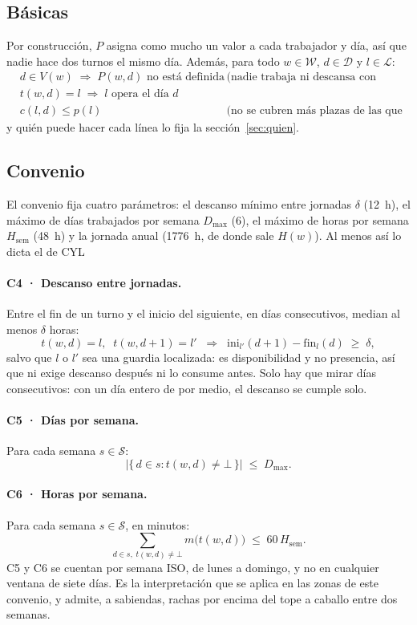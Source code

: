 \documentclass[11pt,a4paper]{article}
\newcommand{\Dias}{\mathcal{D}}
\newcommand{\Sem}{\mathcal{S}}
\newcommand{\Lin}{\mathcal{L}}
\newcommand{\Trab}{\mathcal{W}}
\begin{document}
\subsection{Básicas}

Por construcción, $P$ asigna como mucho un valor a cada trabajador y día, así que nadie hace dos
turnos el mismo día. Además, para todo $w \in \Trab$, $d \in \Dias$ y $l \in \Lin$:
\begin{align*}
  & d \in V(w) \;\Rightarrow\; P(w,d) \text{ no está definida}
      && \text{(nadie trabaja ni descansa con nombre en vacaciones)}\\
  & t(w,d) = l \;\Rightarrow\; l \text{ opera el día } d
      && \\
  & c(l,d) \le p(l)
      && \text{(no se cubren más plazas de las que hay)}
\end{align*}
y quién puede hacer cada línea lo fija la sección~\ref{sec:quien}.

\subsection{Convenio}

El convenio fija cuatro parámetros: el descanso mínimo entre jornadas $\delta$ (12~h), el máximo
de días trabajados por semana $D_{\max}$ (6), el máximo de horas por semana $H_{\mathrm{sem}}$
(48~h) y la jornada anual (1776~h, de donde sale $H(w)$). Al menos así lo dicta el de CYL

\paragraph{C4 · Descanso entre jornadas.} Entre el fin de un turno y el inicio del siguiente, en
días consecutivos, median al menos $\delta$ horas:
\[
  t(w,d) = l,\;\; t(w,d+1) = l' \;\;\Rightarrow\;\;
  \mathrm{ini}_{l'}(d+1) - \mathrm{fin}_{l}(d) \;\ge\; \delta,
\]
salvo que $l$ o $l'$ sea una guardia localizada: es disponibilidad y no presencia, así que ni
exige descanso después ni lo consume antes. Solo hay que mirar días consecutivos: con un día
entero de por medio, el descanso se cumple solo.

\paragraph{C5 · Días por semana.} Para cada semana $s \in \Sem$:
\[
  \bigl|\{\, d \in s : t(w,d) \neq \bot \,\}\bigr| \;\le\; D_{\max}.
\]

\paragraph{C6 · Horas por semana.} Para cada semana $s \in \Sem$, en minutos:
\[
  \sum_{d \in s,\; t(w,d) \neq \bot} m\bigl(t(w,d)\bigr) \;\le\; 60\, H_{\mathrm{sem}}.
\]
C5 y C6 se cuentan por semana ISO, de lunes a domingo, y no en cualquier ventana de siete días.
Es la interpretación que se aplica en las zonas de este convenio, y admite, a sabiendas, rachas
por encima del tope a caballo entre dos semanas.
\end{document}
